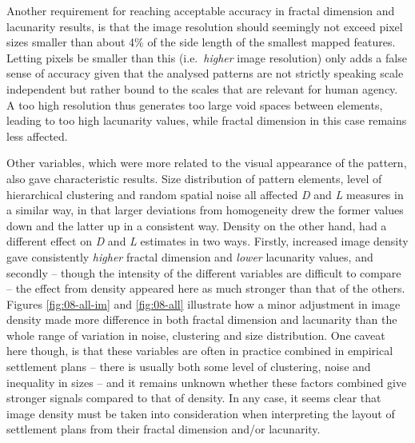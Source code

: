\documentclass[
  12pt,
  a4paper, twoside]{book}
\begin{document}
Another requirement for reaching acceptable accuracy in fractal dimension and lacunarity results, is that the image resolution should seemingly not exceed pixel sizes smaller than about 4\% of the side length of the smallest mapped features. Letting pixels be smaller than this (i.e.~\emph{higher} image resolution) only adds a false sense of accuracy given that the analysed patterns are not strictly speaking scale independent but rather bound to the scales that are relevant for human agency. A too high resolution thus generates too large void spaces between elements, leading to too high lacunarity values, while fractal dimension in this case remains less affected.

Other variables, which were more related to the visual appearance of the pattern, also gave characteristic results. Size distribution of pattern elements, level of hierarchical clustering and random spatial noise all affected \emph{D} and \emph{L} measures in a similar way, in that larger deviations from homogeneity drew the former values down and the latter up in a consistent way. Density on the other hand, had a different effect on \emph{D} and \emph{L} estimates in two ways. Firstly, increased image density gave consistently \emph{higher} fractal dimension and \emph{lower} lacunarity values, and secondly -- though the intensity of the different variables are difficult to compare -- the effect from density appeared here as much stronger than that of the others. Figures \ref{fig:08-all-im} and \ref{fig:08-all} illustrate how a minor adjustment in image density made more difference in both fractal dimension and lacunarity than the whole range of variation in noise, clustering and size distribution. One caveat here though, is that these variables are often in practice combined in empirical settlement plans -- there is usually both some level of clustering, noise and inequality in sizes -- and it remains unknown whether these factors combined give stronger signals compared to that of density. In any case, it seems clear that image density must be taken into consideration when interpreting the layout of settlement plans from their fractal dimension and/or lacunarity.
\end{document}
